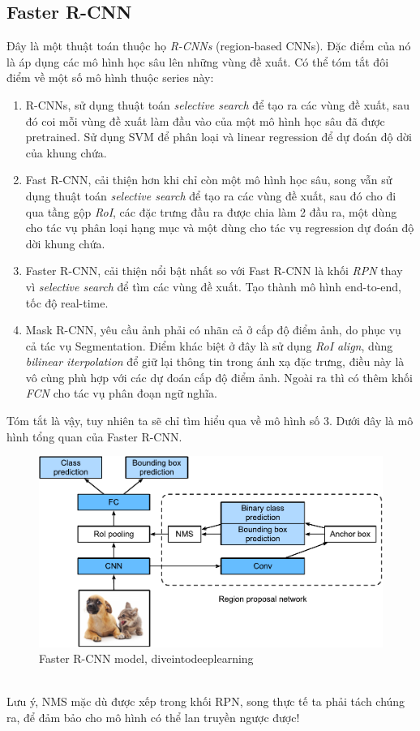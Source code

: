 \documentclass{article}
\begin{document}
\subsection{Faster R-CNN}
Đây là một thuật toán thuộc họ \textit{R-CNNs} (region-based CNNs). Đặc điểm của nó là áp dụng các mô hình học sâu lên những vùng đề xuất. Có thể tóm tắt đôi điểm về một số mô hình thuộc series này: 
\begin{enumerate}
    \item R-CNNs, sử dụng thuật toán \textit{selective search} để tạo ra các vùng đề xuất, sau đó coi mỗi vùng đề xuất làm đầu vào của một mô hình học sâu đã được pretrained. Sử dụng SVM để phân loại và linear regression để dự đoán độ dời của khung chứa.
    \item Fast R-CNN, cải thiện hơn khi chỉ còn một mô hình học sâu, song vẫn sử dụng thuật toán \textit{selective search} để tạo ra các vùng đề xuất, sau đó cho đi qua tầng gộp \textit{RoI}, các đặc trưng đầu ra được chia làm 2 đầu ra, một dùng cho tác vụ phân loại hạng mục và một dùng cho tác vụ regression dự đoán độ dời khung chứa.
    \item Faster R-CNN, cải thiện nổi bật nhất so với Fast R-CNN là khối \textit{RPN} thay vì \textit{selective search} để tìm các vùng đề xuất. Tạo thành mô hình end-to-end, tốc độ real-time.
    \item Mask R-CNN, yêu cầu ảnh phải có nhãn cả ở cấp độ điểm ảnh, do phục vụ cả tác vụ Segmentation. Điểm khác biệt ở đây là sử dụng \textit{RoI align}, dùng \textit{bilinear iterpolation} để giữ lại thông tin trong ánh xạ đặc trưng, điều này là vô cùng phù hợp với các dự đoán cấp độ điểm ảnh. Ngoài ra thì có thêm khối \textit{FCN} cho tác vụ phân đoạn ngữ nghĩa.
\end{enumerate}
Tóm tắt là vậy, tuy nhiên ta sẽ chỉ tìm hiểu qua về mô hình số 3. Dưới đây là mô hình tổng quan của Faster R-CNN.
\begin{figure}[ht!]
    \centering
    \includegraphics[width = 0.8\linewidth]{faster-rcnn.pdf}
    \caption{Faster R-CNN model, diveintodeeplearning}
    \label{fig6}
\end{figure}
\phantom{a}\\
Lưu ý, NMS mặc dù được xếp trong khối RPN, song thực tế ta phải tách chúng ra, để đảm bảo cho mô hình có thể lan truyền ngược được!
\end{document}
